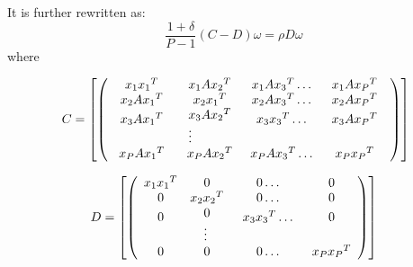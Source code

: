 \documentclass[journal]{IEEEtran}
\begin{document}
It is further rewritten as:
\begin{equation} \frac{{1+ \delta}}{{P - 1}}(C - D)\omega  = \rho D\omega \end{equation}
where
\begin{small}
\begin{equation}
\;C = \left[ {\left( {\begin{array}{*{20}{c}}
{{x_1}{x_1}^T}&{{x_1}A{x_2}^T}&{{x_1}A{x_3}^T \ldots }&{{x_1}A{x_P}^T}\\
{{x_2}A{x_1}^T}&{{x_2}{x_1}^T}&{{x_2}A{x_3}^T \ldots }&{{x_2}A{x_P}^T}\\
\begin{array}{l}
{x_3}A{x_1}^T\\
{\rm{    }}
\end{array}&\begin{array}{l}
{x_3}A{x_2}^T\\
{\rm{     }} \vdots
\end{array}&\begin{array}{l}
{\rm{    }}{x_3}{x_3}^T{\rm{  }} \ldots \\
{\rm{    }}
\end{array}&\begin{array}{l}
{x_3}A{x_P}^T\\
{\rm{   }}
\end{array}\\
{{x_P}A{x_1}^T}&{{x_P}A{x_2}^T}&{{x_P}A{x_3}^T \ldots }&{{x_P}{x_P}^T}
\end{array}} \right)} \right]
\end{equation}
\end{small}
\begin{small}
\begin{equation}
D = \left[ {\left( {\begin{array}{*{20}{c}}
{{x_1}{x_1}^T}&0&{0 \ldots }&0\\
0&{{x_2}{x_2}^T}&{0 \ldots }&0\\
\begin{array}{l}
{\rm{ }}0\\
{\rm{   }}
\end{array}&\begin{array}{l}
{\rm{  }}0\\
{\rm{     }} \vdots
\end{array}&\begin{array}{l}
{\rm{    }}{x_3}{x_3}^T \ldots \\
{\rm{    }}
\end{array}&\begin{array}{l}
{\rm{ }}0\\
{\rm{   }}
\end{array}\\
0&0&{0 \ldots }&{{x_P}{x_P}^T}
\end{array}} \right)} \right]
\end{equation}
\end{small}
\end{document}
